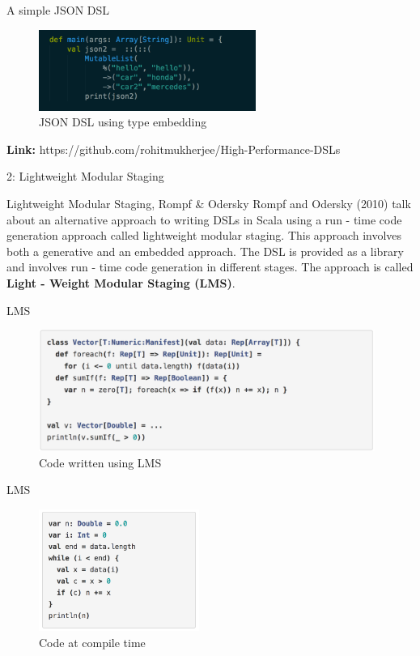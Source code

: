 \documentclass{beamer}
\begin{document}
\begin{frame}{A simple JSON DSL}
\begin{figure}[h!]
  \centering
    \includegraphics[height=100px]{figures/json.png}
  \caption{JSON DSL using type embedding}
\end{figure}
\textbf{Link:} https://github.com/rohitmukherjee/High-Performance-DSLs
\end{frame}

\begin{frame}{2: Lightweight Modular Staging}
\begin{block}{Lightweight Modular Staging, Rompf \& Odersky}
Rompf and Odersky (2010) talk about an alternative approach to writing DSLs in Scala using a run - time code generation approach called lightweight modular staging. This approach involves both a generative and an embedded approach. The DSL is provided as a library and involves run - time code generation in different stages. The approach is called \textbf{Light - Weight Modular Staging (LMS)}.
\end{block}
\end{frame}

\begin{frame}{LMS}
\begin{figure}[h!]
  \centering
    \includegraphics[height=150px]{figures/lms1.png}
  \caption{Code written using LMS}
\end{figure}
\end{frame}

\begin{frame}{LMS}
\begin{figure}[h!]
  \centering
    \includegraphics[height=150px]{figures/lms2.png}
  \caption{Code at compile time}
\end{figure}
\end{frame}
\end{document}
